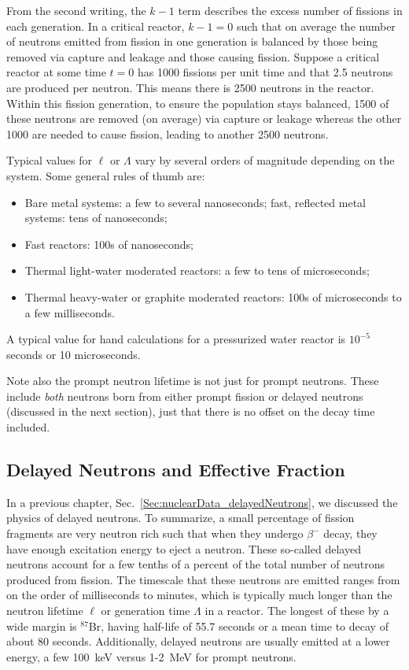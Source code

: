 From the second writing, the $k - 1$ term describes the excess number of fissions in each generation. In a critical reactor, $k - 1 = 0$ such that on average the number of neutrons emitted from fission in one generation is balanced by those being removed via capture and leakage and those causing fission.  Suppose a critical reactor at some time $t = 0$ has 1000 fissions per unit time and that 2.5 neutrons are produced per neutron. This means there is 2500 neutrons in the reactor. Within this fission generation, to ensure the population stays balanced, 1500 of these neutrons are removed (on average) via capture or leakage whereas the other 1000 are needed to cause fission, leading to another 2500 neutrons.

Typical values for $\ell$ or $\Lambda$ vary by several orders of magnitude depending on the system. Some general rules of thumb are:
\begin{itemize}
  \item Bare metal systems: a few to several nanoseconds; fast, reflected metal systems: tens of nanoseconds;
  \item Fast reactors: 100s of nanoseconds;
  \item Thermal light-water moderated reactors: a few to tens of microseconds;
  \item Thermal heavy-water or graphite moderated reactors: 100s of microseconds to a few milliseconds.
\end{itemize}
A typical value for hand calculations for a pressurized water reactor is $10^{-5}$ seconds or 10 microseconds. 

Note also the prompt neutron lifetime is not just for prompt neutrons. These include \emph{both} neutrons born from either prompt fission or delayed neutrons (discussed in the next section), just that there is no offset on the decay time included.

\subsection{Delayed Neutrons and Effective Fraction}

In a previous chapter, Sec.~\ref{Sec:nuclearData_delayedNeutrons}, we discussed the physics of delayed neutrons. To summarize, a small percentage of fission fragments are very neutron rich such that when they undergo $\beta^-$ decay, they have enough excitation energy to eject a neutron. These so-called delayed neutrons account for a few tenths of a percent of the total number of neutrons produced from fission. The timescale that these neutrons are emitted ranges from on the order of milliseconds to minutes, which is typically much longer than the neutron lifetime $\ell$ or generation time $\Lambda$ in a reactor. The longest of these by a wide margin is $^{87}$Br, having half-life of 55.7 seconds or a mean time to decay of about 80 seconds. Additionally, delayed neutrons are usually emitted at a lower energy, a few 100~keV versus 1-2~MeV for prompt neutrons.

